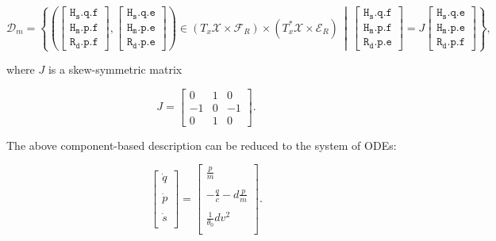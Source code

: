 \documentclass[
	parskip, 			   %
	twoside, 			   %
	DIV=14, 			   %
	BCOR=15.0mm, 		   %
	headsepline, 		   %
	open=right, 		   %
	captions=tableheading, %
	bibliography=totoc,    %
	numbers=noenddot       %
]{scrreprt}
\begin{document}
\begin{equation}
    \label{eq:Dirac_structure_idho}
    \mathcal{D}_m=\left\{ \left( \left[\begin{array}{l}\mathtt{H_{s}.q.f} \\ \mathtt{H_{m}.p.f} \\ \hline \mathtt{R_{d}.p.f} \end{array} \right], \left[\begin{array}{l} \mathtt{H_{s}.q.e} \\ \mathtt{H_{m}.p.e} \\ \hline \mathtt{R_{d}.p.e} \end{array}\right] \right) \in (T_{x}\mathcal{X} \times \mathcal{F}_R) \times (T_{x}^{*}\mathcal{X} \times \mathcal{E}_R)    \,\middle\vert\,    \left[\begin{array}{l}\mathtt{H_{s}.q.f} \\ \mathtt{H_{m}.p.f} \\ \hline \mathtt{R_{d}.p.e}\end{array}\right]=J\left[\begin{array}{l}\mathtt{H_{s}.q.e} \\ \mathtt{H_{m}.p.e} \\ \hline \mathtt{R_{d}.p.f} \end{array}\right]\right\},
\end{equation}

where $J$ is a skew-symmetric matrix

\begin{equation}
    \label{eq:skew-symmetric_matrix_idho}
    J = 
    \left[\begin{array}{rr|r}
    0 & 1 & 0 \\
    -1 & 0 & -1 \\
    \hline 0 & 1 & 0
    \end{array}\right].
\end{equation}

The above component-based description can be reduced to the system of ODEs:

\begin{equation}
    \label{eq:ODE_isothermal_damped_harmonic_oscillator}
    \begin{bmatrix}
    \dot{q}\\
    \\
    \dot{p}\\
    \\
    \dot{s}\\
    \end{bmatrix}
    =
    \begin{bmatrix}
    \frac{p}{m}\\
    \\
    -\frac{q}{c}-d\frac{p}{m}\\
    \\
    \frac{1}{\theta_{0}} d v^2\\
    \end{bmatrix}.
\end{equation}
\end{document}

